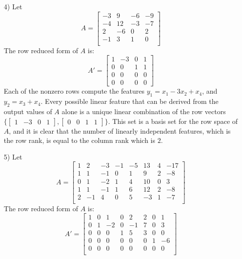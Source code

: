 \documentclass{article}
\begin{document}
\begin{itemize}
\item[4)] Let \[A = \begin{bmatrix}
-3 &   9 & -6 & -9 \\
-4 & 12 & -3 & -7 \\
 2 &  -6 &  0 &  2 \\ 
-1 &   3 &  1 &  0 \\
\end{bmatrix}\]
The row reduced form of \(A\) is: 
\[A' = \begin{bmatrix}
1 & -3 & 0 & 1 \\
0 &  0 & 1 & 1 \\
0 &  0 & 0 & 0 \\ 
0 &  0 & 0 & 0
\end{bmatrix}\]
Each of the nonzero rows compute the features \(y_1 = x_1 - 3x_2 + x_4\), and \(y_2 = x_3 + x_4\). Every possible linear feature that can be derived from the output values of \(A\) alone is a unique linear combination of the row vectors \(\{\begin{bmatrix} 1 & -3 & 0 & 1 \end{bmatrix}, \begin{bmatrix} 0 & 0 & 1 & 1 \end{bmatrix}\}\). This set is a basis set for the row space of \(A\), and it is clear that the number of linearly independent features, which is the row rank, is equal to the column rank which is \(2\).
\item[5)] Let \[A = \begin{bmatrix}
1 &  2 & -3 & -1 & -5 &  13 & 4 & -17 \\
1 &  1 & -1 &  0 &  1 &    9 &  2 &   -8 \\
0 &  1 & -2 &  1 &  4 &  10 &  0 &    3 \\
1 &  1 & -1 &  1 &  6 &  12 &  2 &   -8 \\ 
2 & -1 &  4 &  0 &  5 &  -3 &  1 &   -7 \\ 
\end{bmatrix}\]
The row reduced form of \(A\) is: 
\[A' = \begin{bmatrix}
1 & 0 &  1 & 0 &  2 &  2 & 0 &  1 \\
0 & 1 & -2 & 0 & -1 & 7 & 0 &  3 \\
0 & 0 &  0 & 1 &  5 &  3 & 0 &  0 \\
0 & 0 &  0 & 0 &  0 &  0 & 1 & -6 \\ 
0 & 0 &  0 & 0 &  0 &  0 & 0 &  0 \\

\end{bmatrix}\]
\end{itemize}
\end{document}
